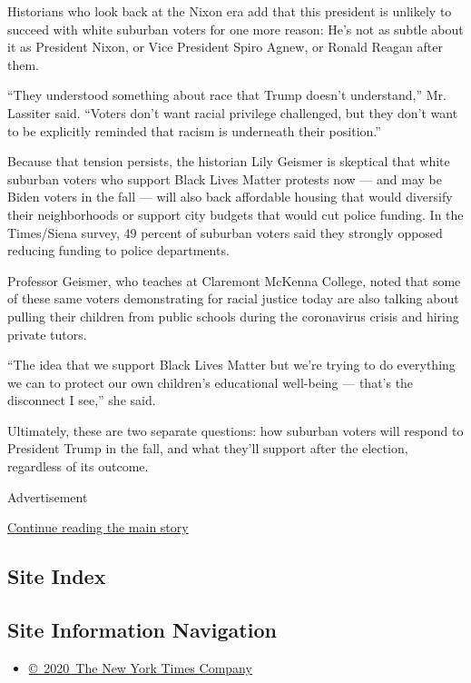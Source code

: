 Historians who look back at the Nixon era add that this president is
unlikely to succeed with white suburban voters for one more reason: He's
not as subtle about it as President Nixon, or Vice President Spiro
Agnew, or Ronald Reagan after them.

``They understood something about race that Trump doesn't understand,''
Mr. Lassiter said. ``Voters don't want racial privilege challenged, but
they don't want to be explicitly reminded that racism is underneath
their position.''

Because that tension persists, the historian Lily Geismer is skeptical
that white suburban voters who support Black Lives Matter protests now
--- and may be Biden voters in the fall --- will also back affordable
housing that would diversify their neighborhoods or support city budgets
that would cut police funding. In the Times/Siena survey, 49 percent of
suburban voters said they strongly opposed reducing funding to police
departments.

Professor Geismer, who teaches at Claremont McKenna College, noted that
some of these same voters demonstrating for racial justice today are
also talking about pulling their children from public schools during the
coronavirus crisis and hiring private tutors.

``The idea that we support Black Lives Matter but we're trying to do
everything we can to protect our own children's educational well-being
--- that's the disconnect I see,'' she said.

Ultimately, these are two separate questions: how suburban voters will
respond to President Trump in the fall, and what they'll support after
the election, regardless of its outcome.

Advertisement

\protect\hyperlink{after-bottom}{Continue reading the main story}

\hypertarget{site-index}{%
\subsection{Site Index}\label{site-index}}

\hypertarget{site-information-navigation}{%
\subsection{Site Information
Navigation}\label{site-information-navigation}}

\begin{itemize}
\tightlist
\item
  \href{https://help.nytimes3xbfgragh.onion/hc/en-us/articles/115014792127-Copyright-notice}{©~2020~The
  New York Times Company}
\end{itemize}


